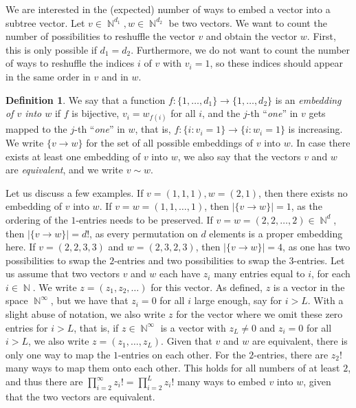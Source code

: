 \documentclass[11pt]{article}
\numberwithin{equation}{section}
\DeclareMathOperator{\N}{\mathbb{N}} %
\theoremstyle{definition}
\newtheorem{definition}[theorem]{Definition}
\begin{document}
We are interested in the (expected) number of ways to embed a vector into a subtree vector. Let $v\in \N^{d_1}, w\in \N^{d_2}$ be two vectors. We want to count the number of possibilities to reshuffle the vector $v$ and obtain the vector $w$. First, this is only possible if $d_1=d_2$. Furthermore, we do not want to count the number of ways to reshuffle the indices $i$ of $v$ with $v_i=1$, so these indices should appear in the same order in $v$ and in $w$.

\begin{definition}
    We say that a function $f:\{1,\ldots, d_1\} \to \{1,\ldots, d_2\}$ is an \textit{embedding of $v$ into $w$}  if $f$ is bijective, $v_{i}=w_{f(i)}$ for all $i$, and the $j$-th ``\textit{one}'' in $v$ gets mapped to the $j$-th ``\textit{one}'' in $w$, that is, $f: \{i: v_i=1\} \to \{i: w_i=1\}$ is increasing. We write $\{v\rightarrow w\}$ for the set of all possible embeddings of $v$ into $w$. In case there exists at least one embedding of $v$ into $w$, we also say that the vectors $v$ and $w$ are \textit{equivalent}, and we write $v \sim w$. 
\end{definition}



\noindent Let us discuss a few examples. If $v=(1,1,1), w=(2,1)$, then there exists no embedding of $v$ into $w$. If $v=w=(1,1,\ldots,1)$, then $\left| \{v\rightarrow w\} \right| = 1$, as the ordering of the $1$-entries needs to be preserved. If $v=w=(2,2,\ldots,2) \in \N^d$, then $\left| \{v\rightarrow w\} \right| = d!$, as every permutation on $d$ elements is a proper embedding here. If $v=(2,2,3,3)$ and $w=(2,3,2,3)$, then $\left| \{v\rightarrow w\} \right| = 4$, as one has two possibilities to swap the $2$-entries and two possibilities to swap the $3$-entries.  Let us assume that two vectors $v$ and $w$ each have $z_i$ many entries equal to $i$, for each $i\in\N$. We write $z=(z_1,z_2,\ldots)$ for this vector. As defined, $z$ is a vector in the space $\N^{\infty}$, but we have that $z_i=0$ for all $i$ large enough, say for $i>L$. With a slight abuse of notation, we also write $z$ for the vector where we omit these zero entries for $i>L$, that is, if $z \in \N^{\infty}$ is a vector with $z_L \neq 0$ and $z_i=0$ for all $i>L$, we also write $z=(z_1,\ldots, z_L)$. Given that $v$ and $w$ are equivalent, there is only one way to map the $1$-entries on each other. For the $2$-entries, there are $z_2!$ many ways to map them onto each other. This holds for all numbers of at least $2$, and thus there are $\prod_{i=2}^{\infty} z_i! = \prod_{i=2}^{L} z_i!$ many ways to embed $v$ into $w$, given that the two vectors are equivalent. 
\end{document}

